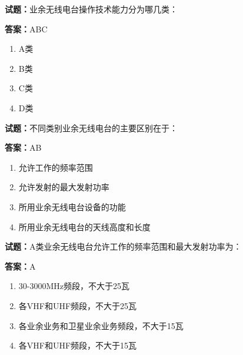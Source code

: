 \documentclass{ctexbook}
\begin{document}




\vspace{1em}

\textbf{试题：}业余无线电台操作技术能力分为哪几类： 

\textbf{答案：}ABC 

\begin{enumerate}[leftmargin=3em]
  \item A类 

  \item B类 

  \item C类 


  \item D类 

\end{enumerate}





\vspace{1em}

\textbf{试题：}不同类别业余无线电台的主要区别在于： 

\textbf{答案：}AB 

\begin{enumerate}[leftmargin=3em]
  \item 允许工作的频率范围 

  \item 允许发射的最大发射功率 

  \item 所用业余无线电台设备的功能 

  \item 所用业余无线电台的天线高度和长度 

\end{enumerate}





\vspace{1em}

\textbf{试题：}A类业余无线电台允许工作的频率范围和最大发射功率为： 

\textbf{答案：}A 

\begin{enumerate}[leftmargin=3em]
  \item 30-3000MHz频段，不大于25瓦 

  \item 各VHF和UHF频段，不大于25瓦 

  \item 各业余业务和卫星业余业务频段，不大于15瓦 

  \item 各VHF和UHF频段，不大于15瓦 

\end{enumerate}
\end{document}

